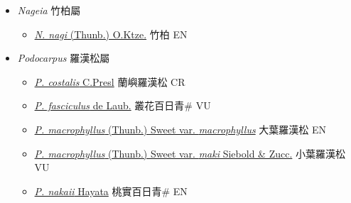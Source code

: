 
  \begin{itemize}
 \item[] \textit{Nageia} 竹柏屬
                    
  \begin{itemize}
        \item[] \href{http://www.theplantlist.org/tpl1.1/search?q=Nageia+nagi}{\textit{N. nagi} (Thunb.) O.Ktze.}   竹柏 EN
  \end{itemize}
 \item[] \textit{Podocarpus} 羅漢松屬
                    
  \begin{itemize}
        \item[] \href{http://www.theplantlist.org/tpl1.1/search?q=Podocarpus+costalis}{\textit{P. costalis} C.Presl}   蘭嶼羅漢松 CR
        \item[] \href{http://www.theplantlist.org/tpl1.1/search?q=Podocarpus+fasciculus}{\textit{P. fasciculus} de Laub.}   叢花百日青\# VU
        \item[] \href{http://www.theplantlist.org/tpl1.1/search?q=Podocarpus+macrophyllus+var.+macrophyllus}{\textit{P. macrophyllus} (Thunb.) Sweet var. \textit{macrophyllus}}   大葉羅漢松 EN
        \item[] \href{http://www.theplantlist.org/tpl1.1/search?q=Podocarpus+macrophyllus+var.+maki}{\textit{P. macrophyllus} (Thunb.) Sweet var. \textit{maki} Siebold \& Zucc.}   小葉羅漢松 VU
        \item[] \href{http://www.theplantlist.org/tpl1.1/search?q=Podocarpus+nakaii}{\textit{P. nakaii} Hayata}   桃實百日青\# EN
  \end{itemize}
  \end{itemize}
